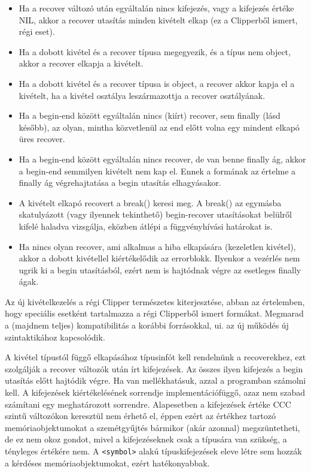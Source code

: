\begin{itemize}
\item
Ha a recover változó után egyáltalán nincs kifejezés,
vagy a kifejezés értéke NIL, 
akkor a recover utasítás minden kivételt elkap 
(ez a Clipperből ismert, régi eset).

\item
Ha a dobott kivétel és a recover típusa megegyezik,
és a típus nem object, akkor a recover elkapja a kivételt.

\item
Ha a dobott kivétel és a recover típusa is object,
a recover akkor kapja el a kivételt, ha a kivétel osztálya
leszármazottja a recover osztályának.

\item
Ha a begin-end között egyáltalán nincs (kiírt) recover, 
sem finally (lásd később), az olyan, mintha közvetlenül az end előtt 
volna  egy  mindent elkapó üres recover.

\item
Ha a begin-end között egyáltalán nincs recover,
de van benne finally ág,
akkor a begin-end semmilyen kivételt nem kap el. 
Ennek a formának az értelme a finally ág végrehajtatása
a begin utasítás elhagyásakor.

\item
A kivételt elkapó recovert a break() keresi meg. 
A break() az egymásba skatulyázott (vagy ilyennek tekinthető)
begin-recover utasításokat belülről kifelé haladva vizsgálja, 
eközben átlépi a függvényhívási határokat is.

\item
Ha nincs olyan recover, ami alkalmas a hiba elkapására
(kezeletlen kivétel), akkor a dobott kivétellel kiértékelődik
az errorblokk. Ilyenkor a vezérlés nem ugrik ki a begin
utasításból, ezért nem is hajtódnak végre az esetleges
finally ágak.
\end{itemize}



\megj Az új kivételkezelés a régi Clipper természetes kiterjesztése,
abban az értelemben, hogy  speciális esetként tartalmazza a régi Clipperből
ismert formákat. Megmarad a (majdnem teljes) kompatibilitás 
a korábbi forrásokkal, ui. az új működés új szintaktikához kapcsolódik.

\megj  A kivétel típustól függő elkapásához típusinfót
kell rendelnünk a recoverekhez, ezt szolgálják a recover változók
után írt kifejezések. Az összes ilyen kifejezés a begin utasítás előtt
hajtódik végre. Ha van mellékhatásuk, azzal a programban 
számolni kell. A kifejezések kiértékelésének sorrendje implementációfüggő,
azaz nem szabad számítani egy meghatározott sorrendre.
Alapesetben a kifejezések értéke CCC szintű változókon keresztül 
nem érhető el, éppen ezért az értékhez tartozó memóriaobjektumokat
a szemétgyűjtés bármikor (akár azonnal) megszüntetheti, de ez nem 
okoz gondot, mivel a kifejezéseknek csak a típusára van szükség,
a tényleges értékére nem. A \verb!<symbol>! alakú típuskifejezések eleve létre
sem hozzák a kérdéses memóriaobjektumokat, ezért hatékonyabbak.

